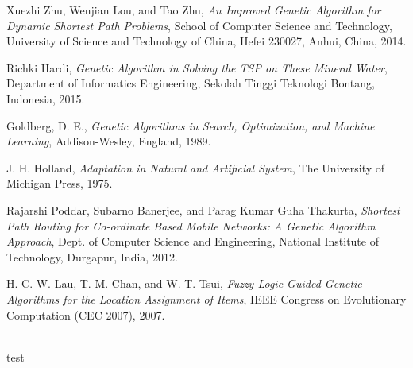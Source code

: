 \documentclass[journal]{IEEEtran}
\begin{document}
\begin{thebibliography}{5}

Xuezhi Zhu, Wenjian Lou, and Tao Zhu,
\textit{An Improved Genetic Algorithm for Dynamic Shortest Path Problems},
School of Computer Science and Technology, University of Science and Technology of China, Hefei 230027, Anhui, China, 2014.

Richki Hardi,
\textit{Genetic Algorithm in Solving the TSP on These Mineral Water},
Department of Informatics Engineering, Sekolah Tinggi Teknologi Bontang, Indonesia, 2015.

Goldberg, D. E.,
\textit{Genetic Algorithms in Search, Optimization, and Machine Learning},
Addison-Wesley, England, 1989.

J. H. Holland,
\textit{Adaptation in Natural and Artificial System},
The University of Michigan Press, 1975.

Rajarshi Poddar, Subarno Banerjee, and Parag Kumar Guha Thakurta,
\textit{Shortest Path Routing for Co-ordinate Based Mobile Networks: A Genetic Algorithm Approach},
Dept. of Computer Science and Engineering, National Institute of Technology, Durgapur, India, 2012.

H. C. W. Lau, T. M. Chan, and W. T. Tsui,
\textit{Fuzzy Logic Guided Genetic Algorithms for the Location Assignment of Items},
IEEE Congress on Evolutionary Computation (CEC 2007), 2007.

\\
test
\end{thebibliography}
\end{document}
